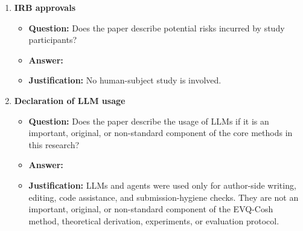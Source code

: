 \documentclass{article}
\begin{document}
\begin{enumerate}
\item \textbf{IRB approvals}
\begin{itemize}
\item \textbf{Question:} Does the paper describe potential risks incurred by study participants?
\item \textbf{Answer:} \answerNA{}
\item \textbf{Justification:} No human-subject study is involved.
\end{itemize}

\item \textbf{Declaration of LLM usage}
\begin{itemize}
\item \textbf{Question:} Does the paper describe the usage of LLMs if it is an important, original, or non-standard component of the core methods in this research?
\item \textbf{Answer:} \answerNA{}
\item \textbf{Justification:} LLMs and agents were used only for author-side writing, editing, code assistance, and submission-hygiene checks. They are not an important, original, or non-standard component of the EVQ-Cosh method, theoretical derivation, experiments, or evaluation protocol.
\end{itemize}
\end{enumerate}
\end{document}
